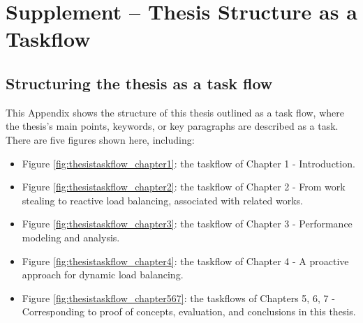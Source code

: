 \chapter{Supplement -- Thesis Structure as a Taskflow}
\label{App_C:ThesisWorkflow}
\chaptertoc

\section{Structuring the thesis as a task flow}
\label{App_C_sec:intro_taskflow}

This Appendix shows the structure of this thesis outlined as a task flow, where the thesis's main points, keywords, or key paragraphs are described as a task. There are five figures shown here, including:
\begin{itemize}
	\item Figure \ref{fig:thesistaskflow_chapter1}: the taskflow of Chapter 1 - Introduction.
	\item Figure \ref{fig:thesistaskflow_chapter2}: the taskflow of Chapter 2 - From work stealing to reactive load balancing, associated with related works.
	\item Figure \ref{fig:thesistaskflow_chapter3}: the taskflow of Chapter 3 - Performance modeling and analysis.
	\item Figure \ref{fig:thesistaskflow_chapter4}: the taskflow of Chapter 4 - A proactive approach for dynamic load balancing.
	\item Figure \ref{fig:thesistaskflow_chapter567}: the taskflows of Chapters 5, 6, 7 - Corresponding to proof of concepts, evaluation, and conclusions in this thesis.
\end{itemize}

